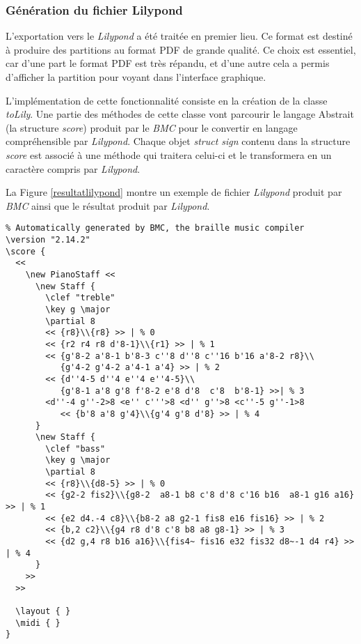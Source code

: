 
\subsubsection{Génération du fichier Lilypond}
L'exportation vers le \textit{Lilypond} a été traitée en premier lieu.
Ce format est destiné à produire des partitions au format PDF de
grande qualité. Ce choix est essentiel, car d'une part le
format PDF est très répandu, et d'une autre cela a permis d'afficher la partition pour voyant dans l'interface graphique.

L'implémentation de cette fonctionnalité consiste en la création de la
classe \textit{toLily}. Une partie des méthodes de cette classe vont
parcourir le langage Abstrait (la structure \textit{score}) produit par le \textit{BMC}
pour le convertir en langage compréhensible par \textit{Lilypond}. Chaque
objet \textit{struct sign} contenu dans la structure \textit{score} est
associé à une méthode qui traitera celui-ci et le transformera en un
caractère compris par \textit{Lilypond}.

\noindent
La Figure \ref{resultatlilypond} montre un exemple de fichier \textit{Lilypond} produit par \textit{BMC}
ainsi que le résultat produit par \textit{Lilypond}.

\begin{verbatim}
% Automatically generated by BMC, the braille music compiler
\version "2.14.2" 
\score {
  <<
    \new PianoStaff <<
      \new Staff {
        \clef "treble"
        \key g \major
        \partial 8 
        << {r8}\\{r8} >> | % 0
        << {r2 r4 r8 d'8-1}\\{r1} >> | % 1
        << {g'8-2 a'8-1 b'8-3 c''8 d''8 c''16 b'16 a'8-2 r8}\\
           {g'4-2 g'4-2 a'4-1 a'4} >> | % 2   
        << {d''4-5 d''4 e''4 e''4-5}\\
           {g'8-1 a'8 g'8 f'8-2 e'8 d'8  c'8  b'8-1} >>| % 3
        <d''-4 g''-2>8 <e'' c'''>8 <d'' g''>8 <c''-5 g''-1>8 
           << {b'8 a'8 g'4}\\{g'4 g'8 d'8} >> | % 4
      }
      \new Staff {
        \clef "bass"
        \key g \major
        \partial 8 
        << {r8}\\{d8-5} >> | % 0
        << {g2-2 fis2}\\{g8-2  a8-1 b8 c'8 d'8 c'16 b16  a8-1 g16 a16} >> | % 1
        << {e2 d4.-4 c8}\\{b8-2 a8 g2-1 fis8 e16 fis16} >> | % 2
        << {b,2 c2}\\{g4 r8 d'8 c'8 b8 a8 g8-1} >> | % 3
        << {d2 g,4 r8 b16 a16}\\{fis4~ fis16 e32 fis32 d8~-1 d4 r4} >> | % 4
      }
    >>
  >>

  \layout { }
  \midi { }
}
\end{verbatim}

